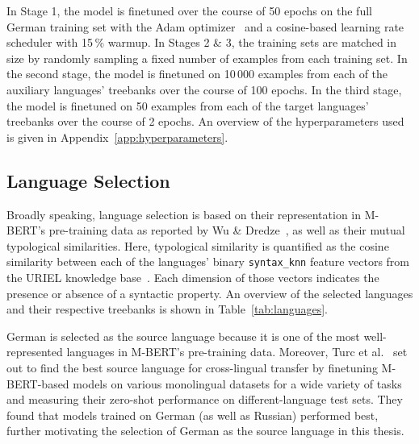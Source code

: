 		In Stage 1, the model is finetuned over the course of 50 epochs on the full German training set with the Adam optimizer~\cite{kingma-ba-2015-adam} and a cosine-based learning rate scheduler with 15\,\% warmup. In Stages 2 \& 3, the training sets are matched in size by randomly sampling a fixed number of examples from each training set. In the second stage, the model is finetuned on 10\,000 examples from each of the auxiliary languages' treebanks over the course of 100 epochs. In the third stage, the model is finetuned on 50 examples from each of the target languages' treebanks over the course of 2 epochs. An overview of the hyperparameters used is given in Appendix~\ref{app:hyperparameters}.

	\subsection{Language Selection}
	\label{sub:language_selection}
		Broadly speaking, language selection is based on their representation in M-BERT's pre-training data as reported by Wu \& Dredze~\cite{wu-dredze-2020-languages}, as well as their mutual typological similarities. Here, typological similarity is quantified as the cosine similarity between each of the languages' binary \texttt{syntax\_knn} feature vectors from the URIEL knowledge base~\cite{littell-etal-2017-uriel}. Each dimension of those vectors indicates the presence or absence of a syntactic property. An overview of the selected languages and their respective treebanks is shown in Table~\ref{tab:languages}.


		German is selected as the source language because it is one of the most well-represented languages in M-BERT's pre-training data. Moreover, Turc et al.~\cite{turc-etal-2021-revisiting} set out to find the best source language for cross-lingual transfer by finetuning M-BERT-based models on various monolingual datasets for a wide variety of tasks and measuring their zero-shot performance on different-language test sets. They found that models trained on German (as well as Russian) performed best, further motivating the selection of German as the source language in this thesis.

